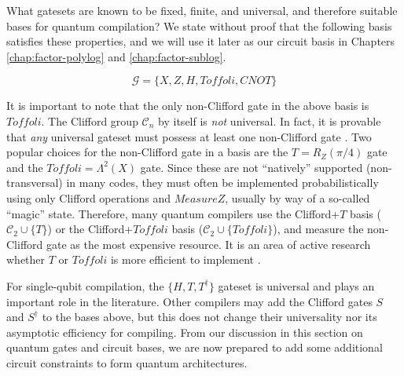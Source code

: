 What gatesets are known to be fixed, finite, and universal, and therefore
suitable bases for quantum compilation? We state without proof that
the following basis satisfies these properties, and we will use it later as
our circuit basis in Chapters \ref{chap:factor-polylog} and
\ref{chap:factor-sublog}.

\begin{equation}
\mathcal{G} = \{X, Z, H, Toffoli, CNOT\}
\end{equation}

It is important to note that the only non-Clifford gate in the above basis
is $Toffoli$.
The Clifford group $\mathcal{C}_n$ by itself is \emph{not}
universal.
In fact, it is provable
that \emph{any} universal gateset must possess at least one
non-Clifford gate \cite{Zeng2011}.
Two popular choices for the non-Clifford gate in a basis are the $T = R_Z(\pi/4)$
gate and the $Toffoli = \Lambda^2(X)$ gate. Since these are not ``natively''
supported (non-transversal) in many codes, they must often be implemented
probabilistically using only Clifford operations and $MeasureZ$, usually
by way of a so-called ``magic'' state.
Therefore, many quantum compilers
use the Clifford+$T$ basis ($\mathcal{C}_2 \cup \{ T \}$)
or the Clifford+$Toffoli$ basis ($\mathcal{C}_2 \cup \{ Toffoli \}$),
and measure
the non-Clifford gate as the most expensive resource. It is an area of
active research
whether $T$ or $Toffoli$ is more efficient to implement
\cite{Jones2013a,Eastin2012}.

For single-qubit compilation, the $\{H,T, T^{\dagger}\}$ gateset is universal and
plays an important role in the literature. Other compilers may add
the Clifford gates $S$ and $S^{\dagger}$ to the bases above,
but this does not change their universality nor its asymptotic efficiency for
compiling. From our discussion in this section
on quantum gates and circuit bases, we are now prepared to add some additional
circuit constraints to form quantum architectures.